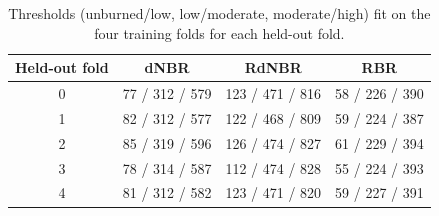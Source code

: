 \begin{table}[H]
\centering
\small
\begin{tabular}{cccc}
\toprule
Held-out fold & dNBR & RdNBR & RBR \\
\midrule
0 & 77 / 312 / 579 & 123 / 471 / 816 & 58 / 226 / 390 \\
1 & 82 / 312 / 577 & 122 / 468 / 809 & 59 / 224 / 387 \\
2 & 85 / 319 / 596 & 126 / 474 / 827 & 61 / 229 / 394 \\
3 & 78 / 314 / 587 & 112 / 474 / 828 & 55 / 224 / 393 \\
4 & 81 / 312 / 582 & 123 / 471 / 820 & 59 / 227 / 391 \\
\bottomrule
\end{tabular}
\caption{Thresholds (unburned/low, low/moderate, moderate/high) fit on the four training folds for each held-out fold.}
\label{tab:learned}
\end{table}
